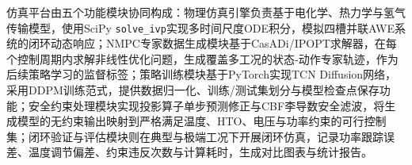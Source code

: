 仿真平台由五个功能模块协同构成：物理仿真引擎负责基于电化学、热力学与氢气传输模型，使用SciPy \texttt{solve\_ivp}实现多时间尺度ODE积分，模拟四槽并联AWE系统的闭环动态响应；NMPC专家数据生成模块基于CasADi/IPOPT求解器，在每个控制周期内求解非线性优化问题，生成覆盖多工况的状态-动作专家轨迹，作为后续策略学习的监督标签；策略训练模块基于PyTorch实现TCN Diffusion网络，采用DDPM训练范式，提供数据归一化、训练/测试集划分与模型检查点保存功能；安全约束处理模块实现投影算子单步预测修正与CBF李导数安全滤波，将生成模型的无约束输出映射到严格满足温度、HTO、电压与功率约束的可行控制集；闭环验证与评估模块则在典型与极端工况下开展闭环仿真，记录功率跟踪误差、温度调节偏差、约束违反次数与计算耗时，生成对比图表与统计报告。

